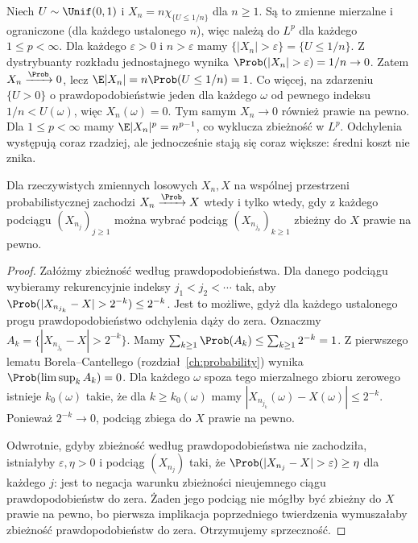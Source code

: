 \begin{przyklad}
Niech $U\sim\Unif(0,1)$ i
$X_n=n\chi_{\{U\leq1/n\}}$ dla $n\geq1$.
Są to zmienne mierzalne i ograniczone (dla każdego
ustalonego $n$), więc należą do $L^p$ dla każdego
$1\leq p<\infty$.
Dla każdego $\varepsilon>0$ i $n>\varepsilon$ mamy
$\{|X_n|>\varepsilon\}=\{U\leq1/n\}$.
Z dystrybuanty rozkładu jednostajnego wynika
$\Prob(|X_n|>\varepsilon)=1/n\to0$.
Zatem $X_n\xrightarrow{\Prob}0$, lecz
$\E|X_n|=n\Prob(U\leq1/n)=1$.
Co więcej, na zdarzeniu $\{U>0\}$ o prawdopodobieństwie
jeden dla każdego $\omega$ od pewnego indeksu
$1/n<U(\omega)$, więc $X_n(\omega)=0$.
Tym samym $X_n\to0$ również prawie na pewno.
Dla $1\leq p<\infty$ mamy
$\E|X_n|^p=n^{p-1}$, co wyklucza zbieżność w $L^p$.
Odchylenia występują coraz rzadziej, ale jednocześnie
stają się coraz większe: średni koszt nie znika.
\end{przyklad}

\begin{twierdzenie}
Dla rzeczywistych zmiennych losowych $X_n,X$ na wspólnej
przestrzeni probabilistycznej zachodzi
$X_n\xrightarrow{\Prob}X$ wtedy i tylko wtedy, gdy
z każdego podciągu $(X_{n_j})_{j\geq1}$ można wybrać
podciąg $(X_{n_{j_k}})_{k\geq1}$ zbieżny do $X$
prawie na pewno.
\end{twierdzenie}
\begin{proof}
Załóżmy zbieżność według prawdopodobieństwa.
Dla danego podciągu wybieramy rekurencyjnie indeksy
$j_1<j_2<\cdots$ tak, aby
$\Prob(|X_{n_{j_k}}-X|>2^{-k})\leq2^{-k}$.
Jest to możliwe, gdyż dla każdego ustalonego progu
prawdopodobieństwo odchylenia dąży do zera.
Oznaczmy $A_k=\{|X_{n_{j_k}}-X|>2^{-k}\}$.
Mamy $\sum_{k\geq1}\Prob(A_k)\leq\sum_{k\geq1}2^{-k}=1$.
Z pierwszego lematu Borela--Cantellego
(rozdział~\ref{ch:probability}) wynika
$\Prob(\limsup_k A_k)=0$.
Dla każdego $\omega$ spoza tego mierzalnego zbioru zerowego
istnieje $k_0(\omega)$ takie, że dla $k\geq k_0(\omega)$
mamy $|X_{n_{j_k}}(\omega)-X(\omega)|\leq2^{-k}$.
Ponieważ $2^{-k}\to0$, podciąg zbiega do $X$ prawie na pewno.

Odwrotnie, gdyby zbieżność według prawdopodobieństwa
nie zachodziła, istniałyby $\varepsilon,\eta>0$ i
podciąg $(X_{n_j})$ taki, że
$\Prob(|X_{n_j}-X|>\varepsilon)\geq\eta$
dla każdego $j$: jest to negacja warunku zbieżności
nieujemnego ciągu prawdopodobieństw do zera.
Żaden jego podciąg nie mógłby być
zbieżny do $X$ prawie na pewno, bo pierwsza implikacja
poprzedniego twierdzenia wymuszałaby zbieżność
prawdopodobieństw do zera. Otrzymujemy sprzeczność.
\end{proof}

